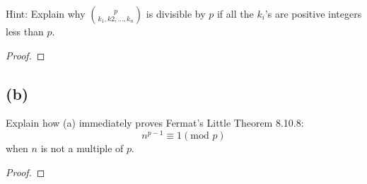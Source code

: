 \documentclass[14pt]{extarticle}
\begin{document}
Hint: Explain why $\binom{p}{k_1, k 2, \ldots, k_n}$ is divisible by $p$ if all the $k_i$’s are positive integers less than $p$.
\begin{proof}
\end{proof}

\subsection{(b)}
Explain how (a) immediately proves Fermat’s Little Theorem 8.10.8: 
$$
n^{p-1} \equiv 1 (\text{mod }p)
$$
when $n$ is not a multiple of $p$.
\begin{proof}
\end{proof}
\end{document}
